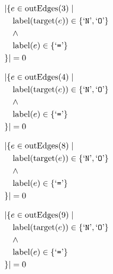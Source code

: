 \begin{align*}
&|\{e \in \mathrm{outEdges}(3)  \mid \\
&\quad \mathrm{label}(\mathrm{target}(e)) \in \{ \text{`\texttt{N}'},  \text{`\texttt{O}'} \}\\
&\quad \wedge\\
&\quad \mathrm{label}(e) \in \{ \text{`\texttt{=}'} \}\\
&\}| = 0
\end{align*}

\begin{align*}
&|\{e \in \mathrm{outEdges}(4)  \mid \\
&\quad \mathrm{label}(\mathrm{target}(e)) \in \{ \text{`\texttt{N}'},  \text{`\texttt{O}'} \}\\
&\quad \wedge\\
&\quad \mathrm{label}(e) \in \{ \text{`\texttt{=}'} \}\\
&\}| = 0
\end{align*}

\begin{align*}
&|\{e \in \mathrm{outEdges}(8)  \mid \\
&\quad \mathrm{label}(\mathrm{target}(e)) \in \{ \text{`\texttt{N}'},  \text{`\texttt{O}'} \}\\
&\quad \wedge\\
&\quad \mathrm{label}(e) \in \{ \text{`\texttt{=}'} \}\\
&\}| = 0
\end{align*}

\begin{align*}
&|\{e \in \mathrm{outEdges}(9)  \mid \\
&\quad \mathrm{label}(\mathrm{target}(e)) \in \{ \text{`\texttt{N}'},  \text{`\texttt{O}'} \}\\
&\quad \wedge\\
&\quad \mathrm{label}(e) \in \{ \text{`\texttt{=}'} \}\\
&\}| = 0
\end{align*}

